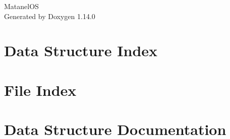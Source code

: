 \documentclass[twoside]{book}
\newcommand{\+}{\discretionary{\mbox{\scriptsize$\hookleftarrow$}}{}{}}
\newcommand{\clearemptydoublepage}{%
    \newpage{\pagestyle{empty}\cleardoublepage}%
  }
\begin{document}
  \raggedbottom
    \hypersetup{pageanchor=false,
                bookmarksnumbered=true,
                pdfencoding=unicode
               }
  \begin{titlepage}
  \vspace*{7cm}
  \begin{center}%
  {\Large Matanel\+OS}\\
  \vspace*{1cm}
  {\large Generated by Doxygen 1.14.0}\\
  \end{center}
  \end{titlepage}
  \clearemptydoublepage
  \tableofcontents
  \clearemptydoublepage
  \hypersetup{pageanchor=true}
\chapter{Data Structure Index}

\chapter{File Index}

\chapter{Data Structure Documentation}




























\end{document}
